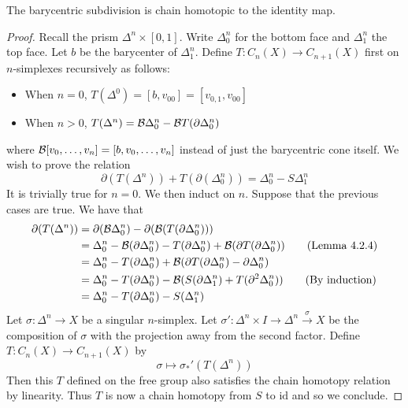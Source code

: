 \documentclass[a4paper]{article}
\begin{document}
\begin{prp}{}{} The barycentric subdivision is chain homotopic to the identity map. \tcbline
\begin{proof}
Recall the prism $\Delta^n\times[0,1]$. Write $\Delta_0^n$ for the bottom face and $\Delta_1^n$ the top face. Let $b$ be the barycenter of $\Delta_1^n$. Define $T:C_n(X)\to C_{n+1}(X)$ first on $n$-simplexes recursively as follows: 
\begin{itemize}
\item When $n=0$, $T(\Delta^0)=[b,v_{00}]=[v_{0,1},v_{00}]$
\item When $n>0$, $T(\Delta^n)=\mathcal{B}\Delta_0^n-\mathcal{B} T(\partial\Delta_0^n)$
\end{itemize}
where $\mathcal{B}[v_0,\dots,v_n]=[b,v_0,\dots,v_n]$ instead of just the barycentric cone itself. 
We wish to prove the relation $$\partial(T(\Delta^n))+T(\partial(\Delta_0^n))=\Delta_0^n-S\Delta_1^n$$ It is trivially true for $n=0$. We then induct on $n$. Suppose that the previous cases are true. We have that 
\begin{align*}
\partial(T(\Delta^n))&=\partial(\mathcal{B}\Delta_0^n)-\partial(\mathcal{B}(T(\partial\Delta_0^n)))\\
&=\Delta_0^n-\mathcal{B}(\partial\Delta_0^n)-T(\partial\Delta_0^n)+\mathcal{B}(\partial T(\partial\Delta_0^n))\tag{Lemma 4.2.4}\\
&=\Delta_0^n-T(\partial\Delta_0^n)+\mathcal{B}(\partial T(\partial\Delta_0^n)-\partial\Delta_0^n)\\
&=\Delta_0^n-T(\partial\Delta_0^n)-\mathcal{B}(S(\partial\Delta_1^n)+T(\partial^2\Delta_0^n))\tag{By induction}\\
&=\Delta_0^n-T(\partial\Delta_0^n)-S(\Delta_1^n)
\end{align*}
Let $\sigma:\Delta^n\to X$ be a singular $n$-simplex. Let $\sigma':\Delta^n\times I\to\Delta^n\overset{\sigma}{\longrightarrow}X$ be the composition of $\sigma$ with the projection away from the second factor. Define $T:C_n(X)\to C_{n+1}(X)$ by $$\sigma\mapsto\sigma_\ast'(T(\Delta^n))$$ Then this $T$ defined on the free group also satisfies the chain homotopy relation by linearity. Thus $T$ is now a chain homotopy from $S$ to $\text{id}$ and so we conclude. 
\end{proof}
\end{prp}
\end{document}
